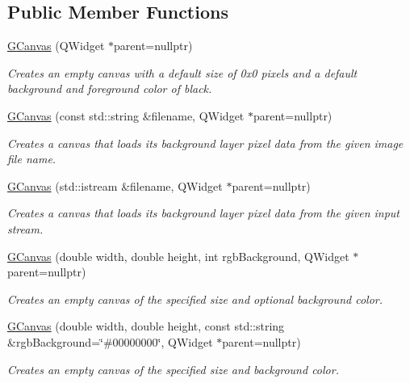 \subsection*{Public Member Functions}
\begin{DoxyCompactItemize}
\item 
\mbox{\hyperlink{classsgl_1_1GCanvas_abb7f95d00cbfadedab276958e1eb2af1}{G\+Canvas}} (Q\+Widget $\ast$parent=nullptr)
\begin{DoxyCompactList}\small\item\em Creates an empty canvas with a default size of 0x0 pixels and a default background and foreground color of black. \end{DoxyCompactList}\item 
\mbox{\hyperlink{classsgl_1_1GCanvas_a0a9de139286d0fc9146928aff8f0538c}{G\+Canvas}} (const std\+::string \&filename, Q\+Widget $\ast$parent=nullptr)
\begin{DoxyCompactList}\small\item\em Creates a canvas that loads its background layer pixel data from the given image file name. \end{DoxyCompactList}\item 
\mbox{\hyperlink{classsgl_1_1GCanvas_a18f1866349219dd73545c6b548ff3b0e}{G\+Canvas}} (std\+::istream \&filename, Q\+Widget $\ast$parent=nullptr)
\begin{DoxyCompactList}\small\item\em Creates a canvas that loads its background layer pixel data from the given input stream. \end{DoxyCompactList}\item 
\mbox{\hyperlink{classsgl_1_1GCanvas_a235f6b1b700354d6737607562df06581}{G\+Canvas}} (double width, double height, int rgb\+Background, Q\+Widget $\ast$parent=nullptr)
\begin{DoxyCompactList}\small\item\em Creates an empty canvas of the specified size and optional background color. \end{DoxyCompactList}\item 
\mbox{\hyperlink{classsgl_1_1GCanvas_af8bb8bd29201bbb5d0f90016a1d8df2c}{G\+Canvas}} (double width, double height, const std\+::string \&rgb\+Background=\char`\"{}\#00000000\char`\"{}, Q\+Widget $\ast$parent=nullptr)
\begin{DoxyCompactList}\small\item\em Creates an empty canvas of the specified size and background color. \end{DoxyCompactList}\item 

\end{DoxyCompactItemize}
